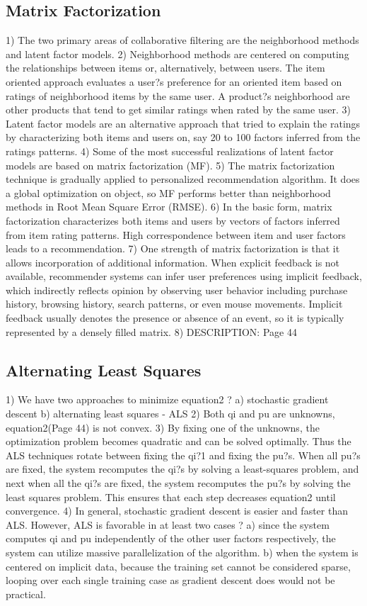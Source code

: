 \documentclass{article} %
\begin{document}
\subsection{Matrix Factorization}
1)	The two primary areas of collaborative filtering are the neighborhood methods and latent factor models. 
2)	Neighborhood methods are centered on computing the relationships between items or, alternatively, between users. The item oriented approach evaluates a user?s preference for an oriented item based on ratings of neighborhood items by the same user. A product?s neighborhood are other products that tend to get similar ratings when rated by the same user.
3)	Latent factor models are an alternative approach that tried to explain the ratings by characterizing both items and users on, say 20 to 100 factors inferred from the ratings patterns.
4)	Some of the most successful realizations of latent factor models are based on matrix factorization (MF).
5)	The matrix factorization technique is gradually applied to personalized recommendation algorithm. It does a global optimization on object, so MF performs better than neighborhood methods in Root Mean Square Error (RMSE).
6)	In the basic form, matrix factorization characterizes both items and users by vectors of factors inferred from item rating patterns. High correspondence between item and user factors leads to a recommendation.
7)	One strength of matrix factorization is that it allows incorporation of additional information. When explicit feedback is not available, recommender systems can infer user preferences using implicit feedback, which indirectly reflects opinion by observing user behavior including purchase history, browsing history, search patterns, or even mouse movements. Implicit feedback usually denotes the presence or absence of an event, so it is typically represented by a densely filled matrix.
8)	DESCRIPTION: Page 44
\subsection{Alternating Least Squares}
1)	We have two approaches to minimize equation2 ? a) stochastic gradient descent  b) alternating least squares - ALS
2)	Both qi and pu are unknowns, equation2(Page 44) is not convex.
3)	By fixing one of the unknowns, the optimization problem becomes quadratic and can be solved optimally. Thus the ALS techniques rotate between fixing the qi?1 and fixing the pu?s. When all pu?s are fixed, the system recomputes the qi?s by solving a least-squares problem, and next when all the qi?s are fixed, the system recomputes the pu?s by solving the least squares problem. This ensures that each step decreases equation2 until convergence.
4)	In general, stochastic gradient descent is easier and faster than ALS. However, ALS is favorable in at least two cases ? a) since the system computes qi and pu independently of the other user factors respectively, the system can utilize massive parallelization of the algorithm. b) when the system is centered on implicit data, because the training set cannot be considered sparse, looping over each single training case as gradient descent does would not be practical.
\end{document}

